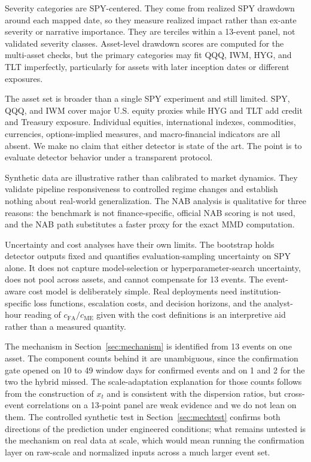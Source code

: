 \documentclass[pdflatex,sn-mathphys-num,iicol]{sn-jnl}
\begin{document}
Severity categories are SPY-centered. They come from realized SPY drawdown around each mapped date, so they measure realized impact rather than ex-ante severity or narrative importance. They are terciles within a 13-event panel, not validated severity classes. Asset-level drawdown scores are computed for the multi-asset checks, but the primary categories may fit QQQ, IWM, HYG, and TLT imperfectly, particularly for assets with later inception dates or different exposures.

The asset set is broader than a single SPY experiment and still limited. SPY, QQQ, and IWM cover major U.S. equity proxies while HYG and TLT add credit and Treasury exposure. Individual equities, international indexes, commodities, currencies, options-implied measures, and macro-financial indicators are all absent. We make no claim that either detector is state of the art. The point is to evaluate detector behavior under a transparent protocol.

Synthetic data are illustrative rather than calibrated to market dynamics. They validate pipeline responsiveness to controlled regime changes and establish nothing about real-world generalization. The NAB analysis is qualitative for three reasons: the benchmark is not finance-specific, official NAB scoring is not used, and the NAB path substitutes a faster proxy for the exact MMD computation.

Uncertainty and cost analyses have their own limits. The bootstrap holds detector outputs fixed and quantifies evaluation-sampling uncertainty on SPY alone. It does not capture model-selection or hyperparameter-search uncertainty, does not pool across assets, and cannot compensate for 13 events. The event-aware cost model is deliberately simple. Real deployments need institution-specific loss functions, escalation costs, and decision horizons, and the analyst-hour reading of $c_{\mathrm{FA}}/c_{\mathrm{ME}}$ given with the cost definitions is an interpretive aid rather than a measured quantity.

The mechanism in Section~\ref{sec:mechanism} is identified from 13 events on one asset. The component counts behind it are unambiguous, since the confirmation gate opened on 10 to 49 window days for confirmed events and on 1 and 2 for the two the hybrid missed. The scale-adaptation explanation for those counts follows from the construction of $x_t$ and is consistent with the dispersion ratios, but cross-event correlations on a 13-point panel are weak evidence and we do not lean on them. The controlled synthetic test in Section~\ref{sec:mechtest} confirms both directions of the prediction under engineered conditions; what remains untested is the mechanism on real data at scale, which would mean running the confirmation layer on raw-scale and normalized inputs across a much larger event set.
\end{document}
